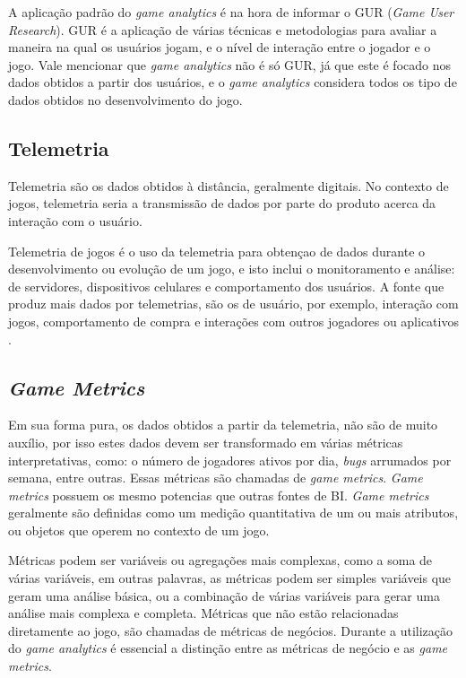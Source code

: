 A aplicação padrão do \textit{game analytics} é na hora de informar o GUR (\textit{Game User Research}). GUR é a aplicação de várias técnicas e metodologias para avaliar a maneira na qual os usuários jogam, e o nível de interação entre o jogador e o jogo. Vale mencionar que \textit{game analytics} não é só GUR, já que este é focado nos dados obtidos a partir dos usuários, e o \textit{game analytics} considera todos os tipo de dados obtidos no desenvolvimento do jogo.
\subsection{Telemetria}
Telemetria são os dados obtidos à distância, geralmente digitais. No contexto de jogos, telemetria seria a transmissão de dados por parte do produto acerca da interação com o usuário.

Telemetria de jogos é o uso da telemetria para obtençao de dados durante o desenvolvimento ou evolução de um jogo, e isto inclui o monitoramento e análise: de servidores, dispositivos celulares e comportamento dos usuários. A fonte que produz mais dados por telemetrias, são os de usuário, por exemplo, interação com jogos, comportamento de compra e interações com outros jogadores ou aplicativos \cite{telemetry}.
\subsection{\textit{Game Metrics}}
Em sua forma pura, os dados obtidos a partir da telemetria, não são de muito auxílio, por isso estes dados devem ser transformado em várias métricas interpretativas, como: o número de jogadores ativos por dia, \textit{bugs} arrumados por semana, entre outras. Essas métricas são chamadas de \textit{game metrics}. \textit{Game metrics} possuem os mesmo potencias que outras fontes de BI. \textit{Game metrics} geralmente são definidas como um medição quantitativa de um ou mais atributos, ou objetos que operem no contexto de um jogo.

Métricas podem ser variáveis ou  agregações mais complexas, como a soma de várias variáveis, em outras palavras, as métricas podem ser simples variáveis que geram uma análise básica, ou a combinação de várias variáveis para gerar uma análise mais complexa e completa. Métricas que não estão relacionadas diretamente ao jogo, são chamadas de métricas de negócios. Durante a utilização do \textit{game analytics} é essencial a distinção entre as métricas de negócio e as \textit{game metrics}.

